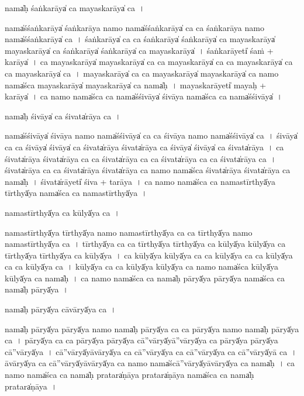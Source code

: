 \documentclass[parskip, DIV=14]{scrartcl}
\begin{document}
{nama̍ḥ śaṅka॒rāya̍ ca mayaska॒rāya̍ ca॒~।

nama̍śśaṅka॒rāya̍ śaṅka॒rāya॒ namo॒ nama̍śśaṅka॒rāya̍ ca ca śaṅka॒rāya॒ namo॒ nama̍śśaṅka॒rāya̍ ca~। 
śa॒ṅka॒rāya̍ ca ca śaṅka॒rāya̍ śaṅka॒rāya̍ ca mayaska॒rāya̍ mayaska॒rāya̍ ca śaṅka॒rāya̍ śaṅka॒rāya̍ ca mayaska॒rāya̍~। 
śa॒ṅka॒rāyeti̍ śaṁ + ka॒rāya̍~। 
ca॒ ma॒ya॒ska॒rāya̍ mayaska॒rāya̍ ca ca mayaska॒rāya̍ ca ca mayaska॒rāya̍ ca ca mayaska॒rāya̍ ca~।
ma॒ya॒ska॒rāya̍ ca ca mayaska॒rāya̍ mayaska॒rāya̍ ca॒ namo॒ nama̍śca mayaska॒rāya̍ mayaska॒rāya̍ ca॒ nama̍ḥ~।
ma॒ya॒ska॒rāyeti̍ mayaḥ + ka॒rāya̍~।
ca॒ namo॒ nama̍śca ca॒ nama̍śśi॒vāya̍ śi॒vāya॒ nama̍śca ca॒ nama̍śśi॒vāya̍~।

nama̍ḥ śi॒vāya̍ ca śi॒vata̍rāya ca॒~।

nama̍śśi॒vāya̍ śi॒vāya॒ namo॒ nama̍śśi॒vāya̍ ca ca śi॒vāya॒ namo॒ nama̍śśi॒vāya̍ ca~।
śi॒vāya̍ ca ca śi॒vāya̍ śi॒vāya̍ ca śi॒vata̍rāya śi॒vata̍rāya ca śi॒vāya̍ śi॒vāya̍ ca śi॒vata̍rāya~।
ca॒ śi॒vata̍rāya śi॒vata̍rāya ca ca śi॒vata̍rāya ca ca śi॒vata̍rāya ca ca śi॒vata̍rāya ca~।
śi॒vata̍rāya ca ca śi॒vata̍rāya śi॒vata̍rāya ca॒ namo॒ nama̍śca śi॒vata̍rāya śi॒vata̍rāya ca॒ nama̍ḥ~।
śi॒vata̍rā॒yeti̍ śi॒va + ta॒rā॒ya॒~।
ca॒ namo॒ nama̍śca ca॒ nama॒stīrthyā̍ya॒ tīrthyā̍ya॒ nama̍śca ca॒ nama॒stīrthyā̍ya~।

nama॒stīrthyā̍ya ca॒ kūlyā̍ya ca॒~।

nama॒stīrthyā̍ya॒ tīrthyā̍ya॒ namo॒ nama॒stīrthyā̍ya ca ca॒ tīrthyā̍ya॒ namo॒ nama॒stīrthyā̍ya ca~।
tīrthyā̍ya ca ca॒ tīrthyā̍ya॒ tīrthyā̍ya ca॒ kūlyā̍ya॒ kūlyā̍ya ca॒ tīrthyā̍ya॒ tīrthyā̍ya ca॒ kūlyā̍ya~।
ca॒ kūlyā̍ya॒ kūlyā̍ya ca ca॒ kūlyā̍ya ca ca॒ kūlyā̍ya ca ca॒ kūlyā̍ya ca~।
kūlyā̍ya ca ca॒ kūlyā̍ya॒ kūlyā̍ya ca॒ namo॒ nama̍śca॒ kūlyā̍ya॒ kūlyā̍ya ca॒ nama̍ḥ~।
ca॒ namo॒ nama̍śca ca॒ nama̍ḥ pā॒ryā̍ya pā॒ryā̍ya॒ nama̍śca ca॒ nama̍ḥ pā॒ryā̍ya~।

nama̍ḥ pā॒ryā̍ya cāvā॒ryā̍ya ca॒~।

nama̍ḥ pā॒ryā̍ya pā॒ryā̍ya॒ namo॒ nama̍ḥ pā॒ryā̍ya ca ca pā॒ryā̍ya॒ namo॒ nama̍ḥ pā॒ryā̍ya ca~।
pā॒ryā̍ya ca ca pā॒ryā̍ya pā॒ryā̍ya cā''vā॒ryā̍yā''vā॒ryā̍ya ca pā॒ryā̍ya pā॒ryā̍ya cā''vā॒ryā̍ya~।
cā॒''vā॒ryā̍yāvā॒ryā̍ya ca cā''vā॒ryā̍ya ca cā''vā॒ryā̍ya ca cā''vā॒ryā̍yā ca~। %
ā॒vā॒ryā̍ya ca cā''vā॒ryā̍yāvā॒ryā̍ya ca॒ namo॒ nama̍ścā''vā॒ryā̍yāvā॒ryā̍ya ca॒ nama̍ḥ~। %
ca॒ namo॒ nama̍śca ca॒ nama̍ḥ pra॒tara̍ṇāya pra॒tara̍ṇāya॒ nama̍śca ca॒ nama̍ḥ pra॒tara̍ṇāya~।

}
\end{document}

